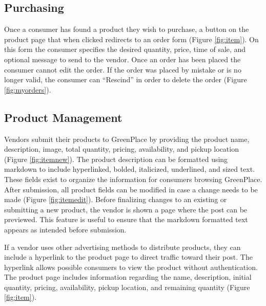 \documentclass[letterpaper, 10 pt, conference]{ieeeconf}  %
\begin{document}
\subsection{Purchasing}

Once a consumer has found a product they wish to purchase, a button on the product page that when clicked redirects to an order form (Figure \ref{fig:item}). On this form the consumer specifies the desired quantity, price, time of sale, and optional message to send to the vendor. Once an order has been placed the consumer cannot edit the order. If the order was placed by mistake or is no longer valid, the consumer can ``Rescind'' in order to delete the order (Figure \ref{fig:myorders}). 

\subsection{Product Management}

Vendors submit their products to GreenPlace by providing the product name, description, image, total quantity, pricing, availability, and pickup location (Figure \ref{fig:itemnew}). The product description can be formatted using markdown to include hyperlinked, bolded, italicized, underlined, and sized text. These fields exist to organize the information for consumers browsing GreenPlace. After submission, all product fields can be modified in case a change needs to be made (Figure \ref{fig:itemedit}). Before finalizing changes to an existing or submitting a new product, the vendor is shown a page where the post can be previewed. This feature is useful to ensure that the markdown formatted text appears as intended before submission.

If a vendor uses other advertising methods to distribute products, they can include a hyperlink to the product page to direct traffic toward their post. The hyperlink allows possible consumers to view the product without authentication. The product page includes information regarding the name, description, initial quantity, pricing, availability, pickup location, and remaining quantity (Figure \ref{fig:item}).
\end{document}
